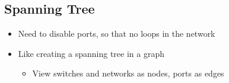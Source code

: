 \subsection{Spanning Tree}
\begin{itemize}[nosep]
    \item Need to disable ports, so that no loops in the network
    \item Like creating a spanning tree in a graph
          \begin{itemize}[nosep]
              \item View switches and networks as nodes, ports as edges
          \end{itemize}
\end{itemize}